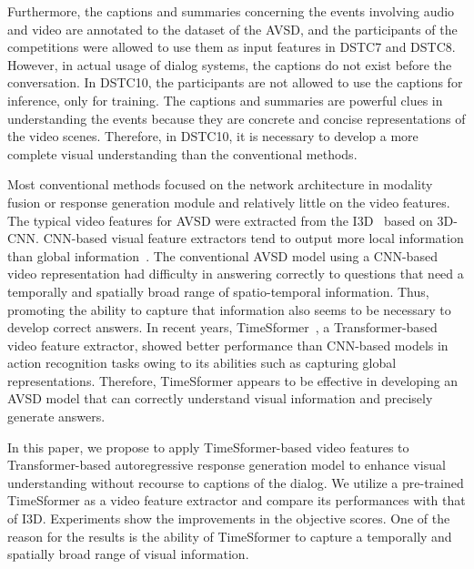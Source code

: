 \documentclass[letterpaper]{article} %
\begin{document}
Furthermore, the captions and summaries concerning the events involving audio and video are annotated to the dataset of the AVSD, and the participants of the competitions were allowed to use them as input features in DSTC7 and DSTC8.
However, in actual usage of dialog systems, the captions do not exist before the conversation.
In DSTC10, the participants are not allowed to use the captions for inference, only for training.
% 
The captions and summaries are powerful clues in understanding the events because they are concrete and concise representations of the video scenes.
Therefore, in DSTC10, it is necessary to develop a more complete visual understanding than the conventional methods.

Most conventional methods focused on the network architecture in modality fusion or response generation module and relatively little on the video features.
The typical video features for AVSD were extracted from the I3D~\cite{Carreira2017quo} based on 3D-CNN.
CNN-based visual feature extractors tend to output more local information than global information~\cite{Raghu2021vision}.
The conventional AVSD model using a CNN-based video representation had difficulty in answering correctly to questions that need a temporally and spatially broad range of spatio-temporal information.
Thus, promoting the ability to capture that information also seems to be necessary to develop correct answers.
In recent years, TimeSformer~\cite{Bertasius2021is}, a Transformer-based video feature extractor, showed better performance than CNN-based models in action recognition tasks owing to its abilities such as capturing global representations.
Therefore, TimeSformer appears to be effective in developing an AVSD model that can correctly understand visual information and precisely generate answers.

In this paper, we propose to apply TimeSformer-based video features to Transformer-based autoregressive response generation model to enhance visual understanding without recourse to captions of the dialog.
We utilize a pre-trained TimeSformer as a video feature extractor and compare its performances with that of I3D.
Experiments show the improvements in the objective scores.
One of the reason for the results is the ability of TimeSformer to capture a temporally and spatially broad range of visual information.
\end{document}
